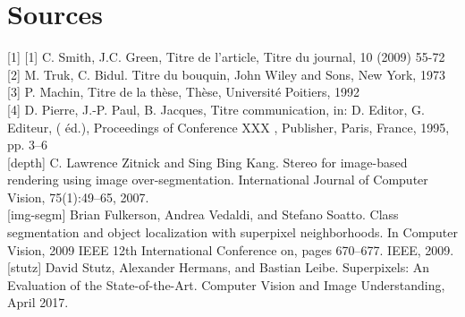 \section*{Sources}

\noindent
{[}1]
{[}1] C. Smith, J.C. Green, Titre de l’article, Titre du journal, 10 (2009) 55-72\\
{[}2] M. Truk, C. Bidul. Titre du bouquin, John Wiley and Sons, New York, 1973\\
{[}3] P. Machin, Titre de la thèse, Thèse, Université Poitiers, 1992\\
{[}4] D. Pierre, J.-P. Paul, B. Jacques, Titre communication, in: D. Editor, G. Editeur, ( éd.), Proceedings of Conference XXX , Publisher, Paris, France, 1995, pp. 3–6\\
{[}depth] C. Lawrence Zitnick and Sing Bing Kang. Stereo for image-based rendering using image over-segmentation. International Journal of Computer Vision, 75(1):49–65, 2007.\\
{[}img-segm] Brian Fulkerson, Andrea Vedaldi, and Stefano Soatto. Class segmentation and object localization with superpixel neighborhoods. In Computer Vision, 2009 IEEE 12th International Conference on, pages 670–677. IEEE, 2009.\\
{[}stutz] David Stutz, Alexander Hermans, and Bastian Leibe. Superpixels: An Evaluation of the State-of-the-Art. Computer Vision and Image Understanding, April 2017.
